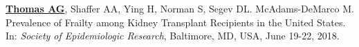 \documentclass[10pt]{article}
\makeatletter
\newlength{\bibhang}
\newlength{\bibsep}
 {\@listi \global\bibsep\itemsep \global\advance\bibsep by\parsep}
\newenvironment{bibenum*}
  {\renewcommand\labelenumi{[\theenumi]}%
   \etaremune[
     topsep=0pt,
     itemsep=\bibsep,
     parsep=0pt,partopsep=0pt,
     itemindent=-\bibhang,
     leftmargin={\bibhang+\widthof{[999]}}]}
  {\endetaremune}
\makeatother
\begin{document}
\begin{bibenum*}
\item \underline{\textbf{Thomas AG}}, Shaffer AA, Ying H, Norman S,
  Segev DL. McAdams-DeMarco M.
  Prevalence of Frailty among Kidney Transplant Recipients in the United States.
  In: \emph{Society of Epidemiologic Research},
  Baltimore, MD, USA, June 19-22, 2018.








\end{bibenum*}
\end{document}
